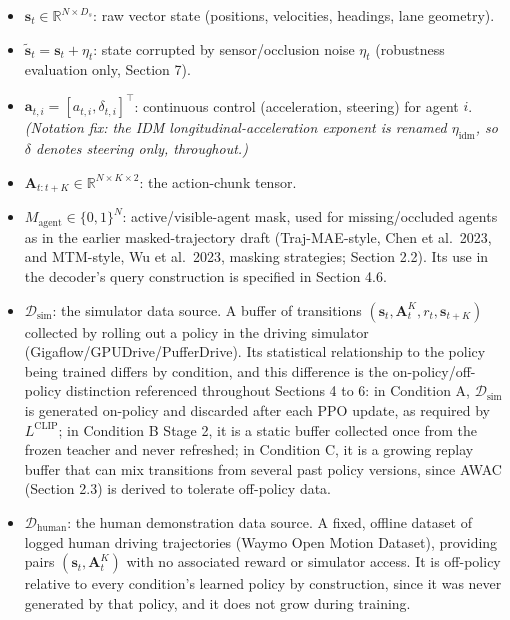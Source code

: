 \documentclass[11pt]{article}
\providecommand{\tightlist}{%
  \setlength{\itemsep}{0pt}\setlength{\parskip}{0pt}}
\begin{document}
\begin{itemize}
\tightlist
\item
  \(\mathbf{s}_t \in \mathbb{R}^{N \times D_s}\): raw vector state (positions, velocities, headings, lane geometry).
\item
  \(\tilde{\mathbf{s}}_t = \mathbf{s}_t + \eta_t\): state corrupted by sensor/occlusion noise \(\eta_t\) (robustness evaluation only, Section 7).
\item
  \(\mathbf{a}_{t,i} = [a_{t,i}, \delta_{t,i}]^\top\): continuous control (acceleration, steering) for agent \(i\). \emph{(Notation fix: the IDM longitudinal-acceleration exponent is renamed \(\eta_{\text{idm}}\), so \(\delta\) denotes steering only, throughout.)}
\item
  \(\mathbf{A}_{t:t+K} \in \mathbb{R}^{N \times K \times 2}\): the action-chunk tensor.
\item
  \(M_{\text{agent}} \in \{0,1\}^N\): active/visible-agent mask, used for missing/occluded agents as in the earlier masked-trajectory draft (Traj-MAE-style, Chen et al.~2023, and MTM-style, Wu et al.~2023, masking strategies; Section 2.2). Its use in the decoder's query construction is specified in Section 4.6.
\item
  \(\mathcal{D}_{\text{sim}}\): the simulator data source. A buffer of transitions \((\mathbf{s}_t, \mathbf{A}_t^K, r_t, \mathbf{s}_{t+K})\) collected by rolling out a policy in the driving simulator (Gigaflow/GPUDrive/PufferDrive). Its statistical relationship to the policy being trained differs by condition, and this difference is the on-policy/off-policy distinction referenced throughout Sections 4 to 6: in Condition A, \(\mathcal{D}_{\text{sim}}\) is generated on-policy and discarded after each PPO update, as required by \(L^{\text{CLIP}}\); in Condition B Stage 2, it is a static buffer collected once from the frozen teacher and never refreshed; in Condition C, it is a growing replay buffer that can mix transitions from several past policy versions, since AWAC (Section 2.3) is derived to tolerate off-policy data.
\item
  \(\mathcal{D}_{\text{human}}\): the human demonstration data source. A fixed, offline dataset of logged human driving trajectories (Waymo Open Motion Dataset), providing pairs \((\mathbf{s}_t, \mathbf{A}_t^K)\) with no associated reward or simulator access. It is off-policy relative to every condition's learned policy by construction, since it was never generated by that policy, and it does not grow during training.
\end{itemize}
\end{document}
